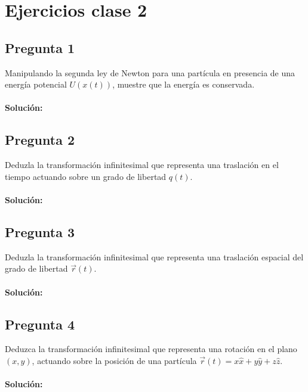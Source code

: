 \documentclass[../main.tex]{subfiles}
\begin{document}
\section{Ejercicios clase 2}
\subsection{Pregunta 1}
Manipulando la segunda ley de Newton para una partícula en presencia de una energía potencial $U(x(t))$, muestre que la energía es conservada. \\
\\
\textbf{Solución:}
\subsection{Pregunta 2}
Deduzla la transformación infinitesimal que representa una traslación en el tiempo actuando sobre un grado de libertad $q(t)$. \\
\\
\textbf{Solución:}
\subsection{Pregunta 3}
Deduzla la transformación infinitesimal que representa una traslación espacial del grado de libertad $\vec{r}(t)$.
\\
\\
\textbf{Solución:}
\subsection{Pregunta 4}
Deduzca la transformación infinitesimal que representa una rotación en el plano $(x,y)$, actuando sobre la posición de una partícula $\vec{r}(t)=x\hat{x}+y\hat{y}+z\hat{z}$.
\\
\\
\textbf{Solución:}
\end{document}
